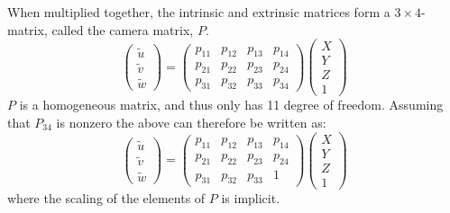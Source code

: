 When multiplied together, the intrinsic and extrinsic matrices form a $3\times4$-matrix, called the camera matrix, $P$.
\begin{equation} \label{eq:projection2}
\begin{pmatrix} \tilde{u} \\ \tilde{v} \\ \tilde{w} \end{pmatrix} =
\begin{pmatrix} p_{11} & p_{12} & p_{13} & p_{14} \\
 				p_{21} & p_{22} & p_{23} & p_{24} \\
				p_{31} & p_{32} & p_{33} & p_{34} \end{pmatrix}
\begin{pmatrix}X \\Y \\Z \\1\end{pmatrix}
\end{equation}
$P$ is a homogeneous matrix, and thus only has 11 degree of freedom.
Assuming that $P_{34}$ is nonzero the above can therefore be written as:
\begin{equation}\label{eq:projection3}
\begin{pmatrix} \tilde{u} \\ \tilde{v} \\ \tilde{w} \end{pmatrix} =
\begin{pmatrix} p_{11} & p_{12} & p_{13} & p_{14} \\
 				p_{21} & p_{22} & p_{23} & p_{24} \\
				p_{31} & p_{32} & p_{33} & 1 \end{pmatrix}
\begin{pmatrix}X \\Y \\Z \\1\end{pmatrix}
\end{equation}
where the scaling of the elements of $P$ is implicit. \cite[153-165]{hartley-zisserman}

